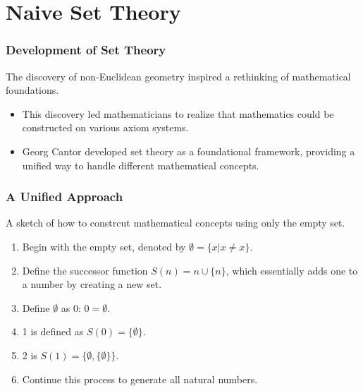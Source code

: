 \documentclass[unicode, 14pt, aspectratio=169]{beamer}
\begin{document}
\section{Naive Set Theory}
\begin{frame}
  \frametitle{Development of Set Theory}
  {\large The discovery of non-Euclidean geometry inspired a rethinking of mathematical foundations.}
  \begin{itemize}
  \item This discovery led mathematicians to realize that mathematics could be constructed on various axiom systems.
  \item Georg Cantor developed set theory as a foundational framework, providing a unified way to handle different mathematical concepts.
  \end{itemize}
\end{frame}
\begin{frame}
  \frametitle{A Unified Approach}
  {\large A sketch of how to constrcut mathematical concepts using only the empty set.}
  \par
  \begin{enumerate}
  \item Begin with the empty set, denoted by $\emptyset = \{x|x\neq x\}$.
  \item Define the successor function $ S(n) = n \cup \{n\} $, which essentially adds one to a number by creating a new set.    
  \item Define $\emptyset$ as 0: $ 0 = \emptyset$.
  \item 1 is defined as $S(0) = \{ \emptyset \}$.
  \item 2 is $S(1) = \{ \emptyset, \{ \emptyset \} \}$.
  \item Continue this process to generate all natural numbers.
  \end{enumerate}
\end{frame}
\end{document}
